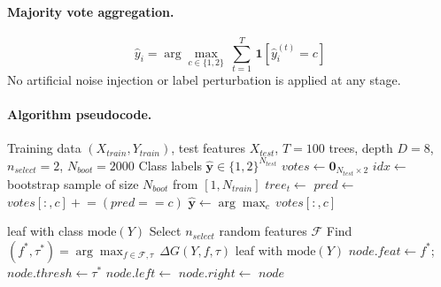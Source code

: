 \documentclass[12pt,a4paper]{article}
\begin{document}
\paragraph{Majority vote aggregation.}
\begin{equation}
    \hat{y}_i = \arg\max_{c\in\{1,2\}}\ \sum_{t=1}^{T}\,
    \mathbf{1}\!\left[\hat{y}_i^{(t)}=c\right]
    \label{eq:vote}
\end{equation}
No artificial noise injection or label perturbation is applied at any stage.

\paragraph{Algorithm pseudocode.}

\begin{algorithm}[H]
\caption{Built-in Random Forest for Crop--Weed Classification}
\label{alg:rf}
\begin{algorithmic}[1]
\Require Training data $(X_{train}, Y_{train})$, test features $X_{test}$,
         $T=100$ trees, depth $D=8$, $n_{select}=2$, $N_{boot}=2000$
\Ensure  Class labels $\hat{\mathbf{y}}\in\{1,2\}^{N_{test}}$
\State $votes \leftarrow \mathbf{0}_{N_{test}\times2}$
    \State $idx \leftarrow$ bootstrap sample of size $N_{boot}$ from $[1,N_{train}]$
    \State $tree_t \leftarrow$ 
    \State $pred \leftarrow$ 
        \State $votes[:,c] \mathrel{+}= (pred == c)$
    \EndFor
\EndFor
\State $\hat{\mathbf{y}} \leftarrow \arg\max_{c}\,votes[:,c]$

        \Return leaf with class $\mathrm{mode}(Y)$
    \EndIf
    \State Select $n_{select}$ random features $\mathcal{F}$
    \State Find $(f^*, \tau^*) = \arg\max_{f\in\mathcal{F},\tau}\,\Delta G(Y, f, \tau)$
     \Return leaf with $\mathrm{mode}(Y)$ \EndIf
    \State $node.feat \leftarrow f^*$; $node.thresh \leftarrow \tau^*$
    \State $node.left  \leftarrow$ 
    \State $node.right \leftarrow$ 
    \Return $node$
\EndProcedure
\end{algorithmic}
\end{algorithm}
\end{document}
